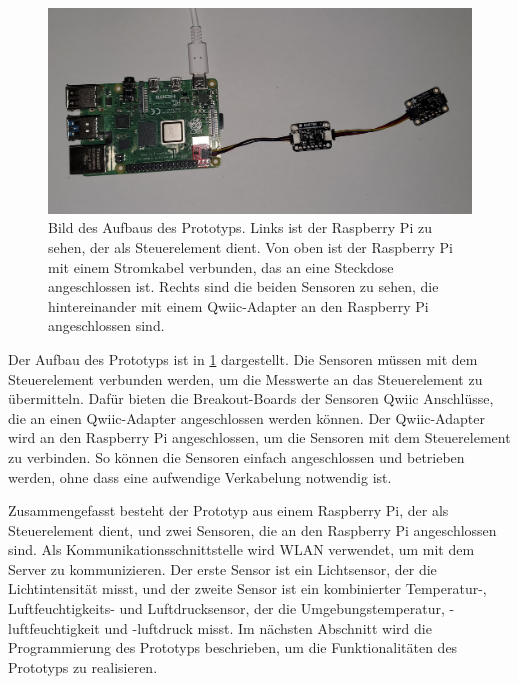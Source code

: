\begin{figure}[!htb]
	\centering
	\includegraphics[width=\textwidth]{images/Aufbau.jpg}
	\caption[Aufbau des Prototyps]{Bild des Aufbaus des Prototyps.
		Links ist der Raspberry Pi zu sehen, der als Steuerelement dient.
		Von oben ist der Raspberry Pi mit einem Stromkabel verbunden, das an eine Steckdose angeschlossen ist.
		Rechts sind die beiden Sensoren zu sehen, die hintereinander mit einem Qwiic-Adapter an den Raspberry Pi angeschlossen sind.
	}
	\label{pic:aufbau}
\end{figure}

Der Aufbau des Prototyps ist in \cref{pic:aufbau} dargestellt.
Die Sensoren müssen mit dem Steuerelement verbunden werden, um die Messwerte an das Steuerelement zu übermitteln.
Dafür bieten die Breakout-Boards der Sensoren Qwiic Anschlüsse, die an einen Qwiic-Adapter angeschlossen werden können.
Der Qwiic-Adapter wird an den Raspberry Pi angeschlossen, um die Sensoren mit dem Steuerelement zu verbinden.
So können die Sensoren einfach angeschlossen und betrieben werden, ohne dass eine aufwendige Verkabelung notwendig ist.

Zusammengefasst besteht der Prototyp aus einem Raspberry Pi, der als Steuerelement dient, und zwei Sensoren, die an den Raspberry Pi angeschlossen sind.
Als Kommunikationsschnittstelle wird WLAN verwendet, um mit dem Server zu kommunizieren.
Der erste Sensor ist ein Lichtsensor, der die Lichtintensität misst, und der zweite Sensor ist ein kombinierter Temperatur-, Luftfeuchtigkeits- und Luftdrucksensor, der die Umgebungstemperatur, -luftfeuchtigkeit und -luftdruck misst.
Im nächsten Abschnitt wird die Programmierung des Prototyps beschrieben, um die Funktionalitäten des Prototyps zu realisieren.



